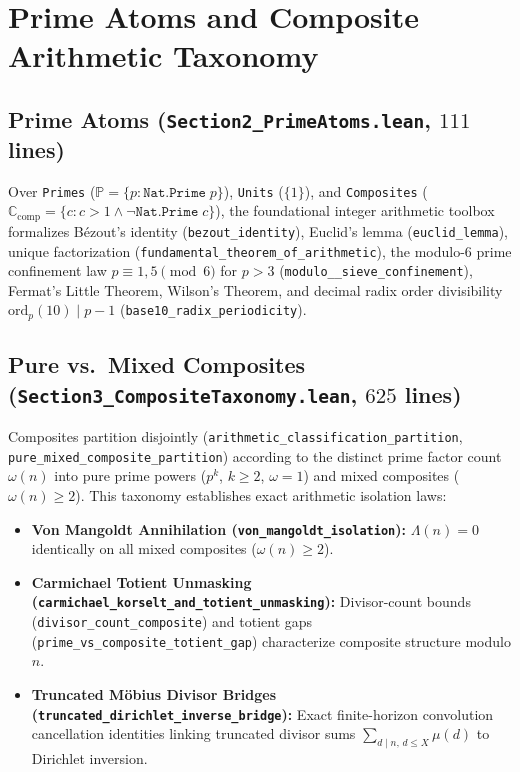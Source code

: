 \documentclass[11pt,a4paper]{article}
\theoremstyle{definition}
\newcommand{\Pset}{\mathbb{P}}
\newcommand{\Ccomp}{\mathbb{C}_{\mathrm{comp}}}
\begin{document}
\section{Prime Atoms and Composite Arithmetic Taxonomy}\label{sec:sections23}

\subsection{Prime Atoms (\texttt{Section2\_\allowbreak PrimeAtoms.lean}, $111$ lines)}
Over \texttt{Primes} ($\Pset = \{p : \texttt{Nat.Prime}\; p\}$), \texttt{Units} ($\{1\}$), and \texttt{Composites} ($\Ccomp = \{c : c > 1 \land \neg \texttt{Nat.Prime}\; c\}$), the foundational integer arithmetic toolbox formalizes B\'ezout's identity (\texttt{bezout\_\allowbreak identity}), Euclid's lemma (\texttt{euclid\_\allowbreak lemma}), unique factorization (\texttt{fundamental\_\allowbreak theorem\_\allowbreak of\_\allowbreak arithmetic}), the modulo-$6$ prime confinement law $p \equiv 1, 5 \pmod 6$ for $p > 3$ (\texttt{modulo\_\_\allowbreak sieve\_\allowbreak confinement}), Fermat's Little Theorem, Wilson's Theorem, and decimal radix order divisibility $\mathrm{ord}_p(10) \mid p - 1$ (\texttt{base10\_\allowbreak radix\_\allowbreak periodicity}).

\subsection{Pure vs.\ Mixed Composites (\texttt{Section3\_\allowbreak CompositeTaxonomy.lean}, $625$ lines)}
Composites partition disjointly (\texttt{arithmetic\_\allowbreak classification\_\allowbreak partition}, \texttt{pure\_\allowbreak mixed\_\allowbreak composite\_\allowbreak partition}) according to the distinct prime factor count $\omega(n)$ into pure prime powers ($p^k$, $k \ge 2$, $\omega = 1$) and mixed composites ($\omega(n) \ge 2$). This taxonomy establishes exact arithmetic isolation laws:
\begin{itemize}[noitemsep]
  \item \textbf{Von Mangoldt Annihilation (\texttt{von\_\allowbreak mangoldt\_\allowbreak isolation}):} $\Lambda(n) = 0$ identically on all mixed composites ($\omega(n) \ge 2$).
  \item \textbf{Carmichael Totient Unmasking (\texttt{carmichael\_\allowbreak korselt\_\allowbreak and\_\allowbreak totient\_\allowbreak unmasking}):} Divisor-count bounds (\texttt{divisor\_\allowbreak count\_\allowbreak composite}) and totient gaps (\texttt{prime\_\allowbreak vs\_\allowbreak composite\_\allowbreak totient\_\allowbreak gap}) characterize composite structure modulo $n$.
  \item \textbf{Truncated M\"obius Divisor Bridges (\texttt{truncated\_\allowbreak dirichlet\_\allowbreak inverse\_\allowbreak bridge}):} Exact finite-horizon convolution cancellation identities linking truncated divisor sums $\sum_{d \mid n,\, d \le X} \mu(d)$ to Dirichlet inversion.
\end{itemize}
\end{document}
